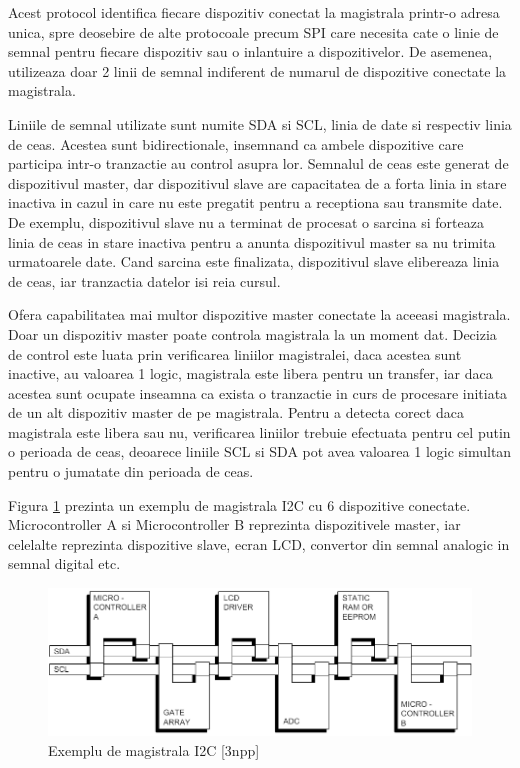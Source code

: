 Acest protocol identifica fiecare dispozitiv conectat la magistrala printr-o adresa unica, spre deosebire de alte protocoale precum SPI care necesita cate o 
linie de semnal pentru fiecare dispozitiv sau o inlantuire a dispozitivelor. De asemenea, utilizeaza doar 2 linii de semnal indiferent de numarul de dispozitive 
conectate la magistrala.

Liniile de semnal utilizate sunt numite SDA si SCL, linia de date si respectiv linia de ceas. Acestea sunt bidirectionale, insemnand ca ambele dispozitive 
care participa intr-o tranzactie au control asupra lor. Semnalul de ceas este generat de dispozitivul master, dar dispozitivul slave are capacitatea de a 
forta linia in stare inactiva in cazul in care nu este pregatit pentru a receptiona sau transmite date. De exemplu, dispozitivul slave nu a terminat de 
procesat o sarcina si forteaza linia de ceas in stare inactiva pentru a anunta dispozitivul master sa nu trimita urmatoarele date. Cand sarcina este finalizata, 
dispozitivul slave elibereaza linia de ceas, iar tranzactia datelor isi reia cursul.

Ofera capabilitatea mai multor dispozitive master conectate la aceeasi magistrala. Doar un dispozitiv master poate controla magistrala la un moment dat. 
Decizia de control este luata prin verificarea liniilor magistralei, daca acestea sunt inactive, au valoarea 1 logic, magistrala este libera pentru un transfer,
iar daca acestea sunt ocupate inseamna ca exista o tranzactie in curs de procesare initiata de un alt dispozitiv master de pe magistrala. Pentru a detecta 
corect daca magistrala este libera sau nu, verificarea liniilor trebuie efectuata pentru cel putin o perioada de ceas, deoarece liniile SCL si SDA pot avea 
valoarea 1 logic simultan pentru o jumatate din perioada de ceas.

Figura \ref{fig:I2CBus} prezinta un exemplu de magistrala I2C cu 6 dispozitive conectate. Microcontroller A si Microcontroller B reprezinta dispozitivele master, 
iar celelalte reprezinta dispozitive slave, ecran LCD, convertor din semnal analogic in semnal digital etc.
\begin{figure}[H]
    \centering
    \includegraphics[scale=0.68]{figs/I2CBus.png}
    \caption{Exemplu de magistrala I2C [3npp]}
    \label{fig:I2CBus}
\end{figure}

